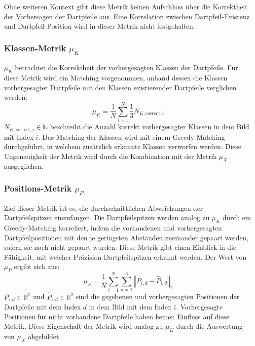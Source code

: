 Ohne weiteren Kontext gibt diese Metrik keinen Aufschluss über die Korrektheit der Vorhersagen der Dartpfeile aus. Eine Korrelation zwischen Dartpfeil-Existenz und Dartpfeil-Position wird in dieser Metrik nicht festgehalten.

\subsubsection{Klassen-Metrik $\mu_K$}

$\mu_K$ betrachtet die Korrektheit der vorhergesagten Klassen der Dartpfeile. Für diese Metrik wird ein Matching vorgenommen, anhand dessen die Klassen vorhergesagter Dartpfeile mit den Klassen existierender Dartpfeile verglichen werden:
\begin{equation*}
    \mu_K = \frac{1}{N}\sum_{i=1}^{N} \frac{1}{3} N_{K, \text{correct}, i}
\end{equation*}
$N_{K, \text{correct}, i} \in \mathbb{N}$ beschreibt die Anzahl korrekt vorhergesagter Klassen in dem Bild mit Index $i$. Das Matching der Klassen wird mit einem Greedy-Matching durchgeführt, in welchem zusätzlich erkannte Klassen verworfen werden. Diese Ungenauigkeit der Metrik wird durch die Kombination mit der Metrik $\mu_X$ ausgeglichen.

\subsubsection{Positions-Metrik $\mu_P$}

Ziel dieser Metrik ist es, die durchschnittlichen Abweichungen der Dartpfeilspitzen einzufangen. Die Dartpfeilspitzen werden analog zu $\mu_K$ durch ein Greedy-Matching korreliert, indem die vorhandenen und vorhergesagten Dartpfeilpositionen mit den je geringsten Abständen zueinander gepaart werden, sofern sie noch nicht gepaart wurden. Diese Metrik gibt einen Einblick in die Fähigkeit, mit welcher Präzision Dartpfeilspitzen erkannt werden. Der Wert von $\mu_P$ ergibt sich aus:
\begin{equation*}
    \mu_P = \frac{1}{N} \sum_{i=1}^{N} \sum_{d=1}^{3} \left\Vert P_{i, d} - \widehat{P}_{i, d} \right\Vert _2
\end{equation*}
$P_{i, d} \in \mathbb{R}^2$ und $\widehat{P}_{i, d} \in \mathbb{R}^2$ sind die gegebenen und vorhergesagten Positionen der Dartpfeile mit dem Index $d$ in dem Bild mit dem Index $i$. Vorhergesagte Positionen für nicht vorhandene Dartpfeile haben keinen Einfluss auf diese Metrik. Diese Eigenschaft der Metrik wird analog zu $\mu_K$ durch die Auswertung von $\mu_X$ abgebildet.

